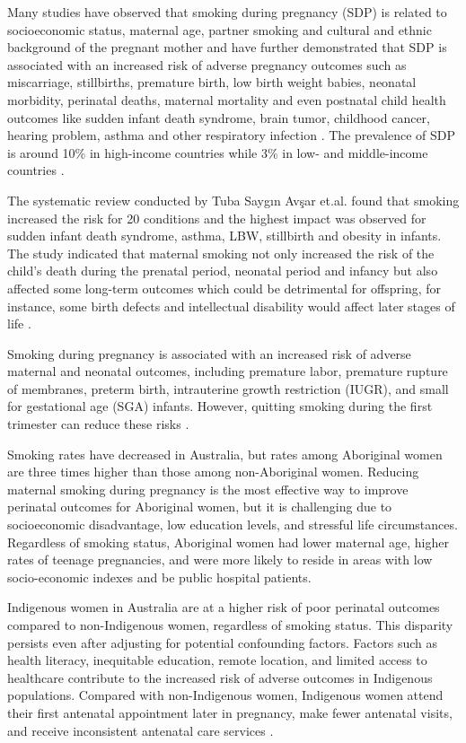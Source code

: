 Many studies have observed that smoking during pregnancy (SDP) is related to socioeconomic status, maternal age, partner smoking and cultural and ethnic background of the pregnant mother and have further demonstrated that SDP is associated with an increased risk of adverse pregnancy outcomes such as miscarriage, stillbirths, premature birth, low birth weight babies, neonatal morbidity, perinatal deaths, maternal mortality and even postnatal child health outcomes like sudden infant death syndrome, brain tumor, childhood cancer, hearing problem, asthma and other respiratory infection \cite{mohsin2010,jackson_2021,popova_2018}. The prevalence of SDP is around 10\% in high-income countries while 3\% in low- and middle-income countries \cite{jackson_2021}.

The systematic review conducted by Tuba Saygın Avşar et.al. found that smoking increased the risk for 20 conditions and the highest impact was observed for sudden infant death syndrome, asthma, LBW, stillbirth and obesity in infants. The study indicated that maternal smoking not only increased the risk of the child's death during the prenatal period, neonatal period and infancy but also affected some long-term outcomes which could be detrimental for offspring, for instance, some birth defects and intellectual disability would affect later stages of life \cite{jackson_2021,popova_2018}. 

Smoking during pregnancy is associated with an increased risk of adverse maternal and neonatal outcomes, including premature labor, premature rupture of membranes, preterm birth, intrauterine growth restriction (IUGR), and small for gestational age (SGA) infants. However, quitting smoking during the first trimester can reduce these risks \cite{clifton_2014,gibbons_2013}. 

Smoking rates have decreased in Australia, but rates among Aboriginal women are three times higher than those among non-Aboriginal women. Reducing maternal smoking during pregnancy is the most effective way to improve perinatal outcomes for Aboriginal women, but it is challenging due to socioeconomic disadvantage, low education levels, and stressful life circumstances. Regardless of smoking status, Aboriginal women had lower maternal age, higher rates of teenage pregnancies, and were more likely to reside in areas with low socio-economic indexes and be public hospital patients.

Indigenous women in Australia are at a higher risk of poor perinatal outcomes compared to non-Indigenous women, regardless of smoking status. This disparity persists even after adjusting for potential confounding factors. Factors such as health literacy, inequitable education, remote location, and limited access to healthcare contribute to the increased risk of adverse outcomes in Indigenous populations. Compared with non-Indigenous women, Indigenous women attend their first antenatal appointment later in pregnancy, make fewer antenatal visits, and receive inconsistent antenatal care services \cite{gibbons_2013}.

